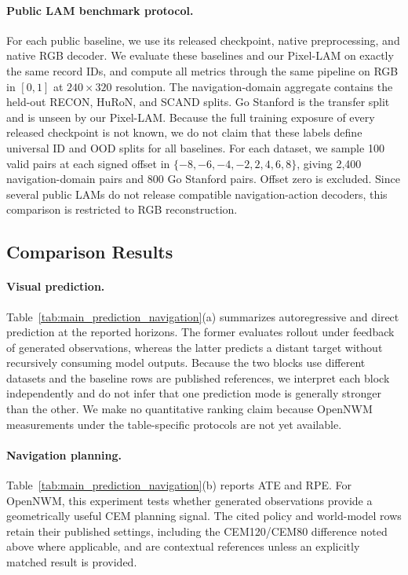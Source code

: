 \paragraph{Public LAM benchmark protocol.}
For each public baseline, we use its released checkpoint, native preprocessing,
and native RGB decoder.  We evaluate these baselines and our Pixel-LAM on
exactly the same record IDs, and compute all metrics through the same pipeline
on RGB in $[0,1]$ at $240\times320$ resolution.  The navigation-domain
aggregate contains the held-out RECON, HuRoN, and SCAND splits.  Go Stanford
is the transfer split and is unseen by our Pixel-LAM.
Because the full training exposure of every released checkpoint is not known,
we do not claim that these labels define universal ID and OOD splits for all
baselines.  For each dataset, we sample 100 valid pairs at each signed offset in
$\{-8,-6,-4,-2,2,4,6,8\}$, giving 2,400 navigation-domain pairs and 800 Go
Stanford pairs.
Offset zero is excluded.  Since several public LAMs do not release compatible
navigation-action decoders, this comparison is restricted to RGB
reconstruction.

\subsection{Comparison Results}



\paragraph{Visual prediction.}
Table~\ref{tab:main_prediction_navigation}(a) summarizes autoregressive and
direct prediction at the reported horizons.  The former evaluates rollout
under feedback of generated observations, whereas the latter predicts a
distant target without recursively consuming model outputs.  Because the two
blocks use different datasets and the baseline rows are published references,
we interpret each block independently and do not infer that one prediction
mode is generally stronger than the other.  We make no quantitative ranking
claim because OpenNWM measurements under the table-specific protocols are not
yet available.

\paragraph{Navigation planning.}
Table~\ref{tab:main_prediction_navigation}(b) reports ATE and RPE.  For
OpenNWM, this experiment tests whether generated observations provide a
geometrically useful CEM planning signal.  The cited policy and world-model
rows retain their published settings, including the CEM120/CEM80 difference
noted above where applicable, and are contextual references unless an
explicitly matched result is provided.

